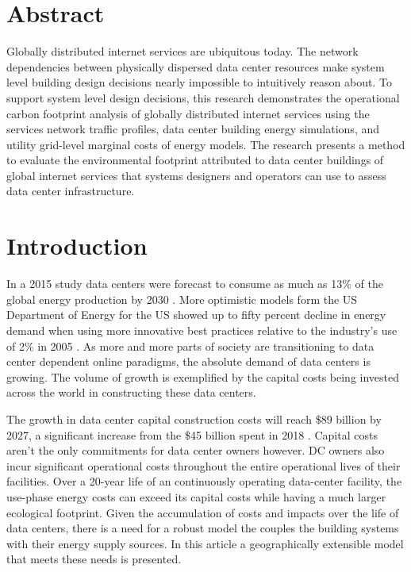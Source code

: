 \section{Abstract}	%
\addtocounter{section}{1}
Globally distributed internet services are ubiquitous today. The network dependencies between physically dispersed data center resources make system level building design decisions nearly impossible to intuitively reason about. To support system level design decisions, this research demonstrates the operational carbon footprint analysis of globally distributed internet services using the service\textsc{}s network traffic profiles, data center building energy simulations, and utility grid-level marginal costs of energy models. The research presents a method to evaluate the environmental footprint attributed to data center buildings of global internet services that systems designers and operators can use to assess data center infrastructure.


\section{Introduction}
In a 2015 study data centers were forecast to consume as much as 13\% of the global energy production by 2030 \cite{andrae15}. More optimistic models form the US Department of Energy for the US showed up to fifty percent decline in energy demand when using more innovative best practices relative to the industry’s use of 2\% in 2005 \cite{Shehabi16}. As more and more parts of society are transitioning to data center dependent online paradigms, the absolute demand of data centers is growing. The volume of growth is exemplified by the capital costs being invested across the world in constructing these data centers.

The growth in data center capital construction costs will reach \$89 billion by 2027, a significant increase from the \$45 billion spent in 2018 \cite{dcmarket19}. Capital costs aren’t the only commitments for data center owners however. DC owner\textsc{}s also incur significant operational costs throughout the entire operational lives of their facilities.  Over a 20-year life of an continuously operating data-center facility, the use-phase energy costs can exceed its capital costs while having a much larger ecological footprint. Given the accumulation of  costs and impacts over the life of data centers, there is a need for a robust model the couples the building systems with their energy supply sources. In this article a geographically extensible model that meets these needs is presented.

